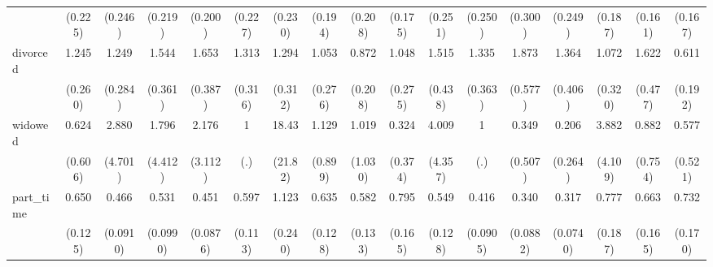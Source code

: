 {\begin{tabular}{l*{16}{c}}
                    &     (0.225)         &     (0.246)         &     (0.219)         &     (0.200)         &     (0.227)         &     (0.230)         &     (0.194)         &     (0.208)         &     (0.175)         &     (0.251)         &     (0.250)         &     (0.300)         &     (0.249)         &     (0.187)         &     (0.161)         &     (0.167)         \\
[1em]
divorced            &       1.245         &       1.249         &       1.544         &       1.653\sym{*}  &       1.313         &       1.294         &       1.053         &       0.872         &       1.048         &       1.515         &       1.335         &       1.873\sym{*}  &       1.364         &       1.072         &       1.622         &       0.611         \\
                    &     (0.260)         &     (0.284)         &     (0.361)         &     (0.387)         &     (0.316)         &     (0.312)         &     (0.276)         &     (0.208)         &     (0.275)         &     (0.438)         &     (0.363)         &     (0.577)         &     (0.406)         &     (0.320)         &     (0.477)         &     (0.192)         \\
[1em]
widowed             &       0.624         &       2.880         &       1.796         &       2.176         &           1         &       18.43\sym{*}  &       1.129         &       1.019         &       0.324         &       4.009         &           1         &       0.349         &       0.206         &       3.882         &       0.882         &       0.577         \\
                    &     (0.606)         &     (4.701)         &     (4.412)         &     (3.112)         &         (.)         &     (21.82)         &     (0.899)         &     (1.030)         &     (0.374)         &     (4.357)         &         (.)         &     (0.507)         &     (0.264)         &     (4.109)         &     (0.754)         &     (0.521)         \\
[1em]
part\_time           &       0.650\sym{*}  &       0.466\sym{***}&       0.531\sym{***}&       0.451\sym{***}&       0.597\sym{**} &       1.123         &       0.635\sym{*}  &       0.582\sym{*}  &       0.795         &       0.549\sym{*}  &       0.416\sym{***}&       0.340\sym{***}&       0.317\sym{***}&       0.777         &       0.663         &       0.732         \\
                    &     (0.125)         &    (0.0910)         &    (0.0990)         &    (0.0876)         &     (0.113)         &     (0.240)         &     (0.128)         &     (0.133)         &     (0.165)         &     (0.128)         &    (0.0905)         &    (0.0882)         &    (0.0740)         &     (0.187)         &     (0.165)         &     (0.170)         \\

\end{tabular}}
